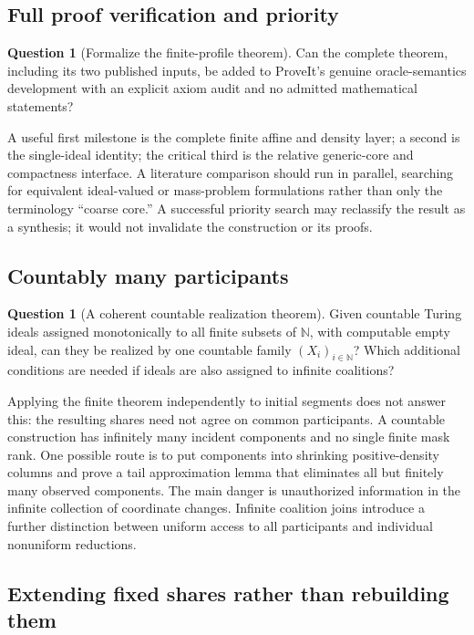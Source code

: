 \documentclass[11pt,letterpaper]{article}
\theoremstyle{plain}
\theoremstyle{definition}
\newtheorem{question}[theorem]{Question}
\theoremstyle{remark}
\numberwithin{equation}{section}
\newcommand{\N}{\mathbb N}
\begin{document}
\subsection{Full proof verification and priority}

\begin{question}[Formalize the finite-profile theorem]\label{cr11:q:formal}
Can the complete theorem, including its two published inputs, be added to
ProveIt's genuine oracle-semantics development with an explicit axiom audit
and no admitted mathematical statements?
\end{question}

A useful first milestone is the complete finite affine and density layer;
a second is the single-ideal identity; the critical third is the
relative generic-core and compactness interface. A literature comparison
should run in parallel, searching for equivalent ideal-valued or
mass-problem formulations rather than only the terminology ``coarse core.''
A successful priority search may reclassify the result as a synthesis; it
would not invalidate the construction or its proofs.

\subsection{Countably many participants}

\begin{question}[A coherent countable realization theorem]\label{cr11:q:countable}
Given countable Turing ideals assigned monotonically to all finite subsets
of $\N$, with computable empty ideal, can they be realized by one countable
family $(X_i)_{i\in\N}$? Which additional conditions are needed if ideals
are also assigned to infinite coalitions?
\end{question}

Applying the finite theorem independently to initial segments does not
answer this: the resulting shares need not agree on common participants.
A countable construction has infinitely many incident components and no
single finite mask rank. One possible route is to put components into
shrinking positive-density columns and prove a tail approximation lemma
that eliminates all but finitely many observed components. The main danger
is unauthorized information in the infinite collection of coordinate
changes. Infinite coalition joins introduce a further distinction between
uniform access to all participants and individual nonuniform reductions.

\subsection{Extending fixed shares rather than rebuilding them}
\end{document}
